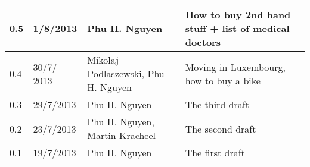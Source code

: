\begin{center}
\begin{table*}[t!]
\begin{tabular}{ | l | l | p{3cm} | p{6cm} |}
  0.5 & 1/8/2013 & Phu H. Nguyen & How to buy 2nd hand stuff + list of medical doctors \\  \hline
  0.4 & 30/7/ 2013 & Mikolaj Podlaszewski, Phu H. Nguyen & Moving in Luxembourg, how to buy a bike \\  \hline
  0.3 & 29/7/2013 & Phu H. Nguyen & The third draft \\    \hline
  0.2 & 23/7/2013 & Phu H. Nguyen, Martin Kracheel & The second draft \\  \hline
  0.1 & 19/7/2013 & Phu H. Nguyen & The first draft \\ \hline
	\end{tabular}
	\label{tab:Revisions}

\end{table*}
\end{center}
